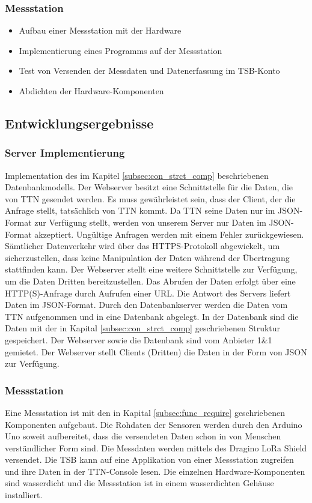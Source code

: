 \subsubsection{Messstation}
\begin{itemize}
	\item Aufbau einer Messstation mit der Hardware
	\item Implementierung eines Programms auf der Messstation
	\item Test von Versenden der Messdaten und Datenerfassung im TSB-Konto
	\item Abdichten der Hardware-Komponenten
\end{itemize}

\subsection{Entwicklungsergebnisse}

\subsubsection{Server Implementierung}

Implementation des im Kapitel \ref{subsec:con_strct_comp} beschriebenen Datenbankmodells. Der Webserver besitzt eine Schnittstelle für die Daten, die von TTN gesendet werden. Es muss gewährleistet sein, dass der Client, der die Anfrage stellt, tats\"achlich von TTN kommt. Da TTN seine Daten nur im JSON-Format zur Verf\"ugung stellt, werden von unserem Server nur Daten im JSON-Format akzeptiert. Ung\"ultige Anfragen werden mit einem Fehler zurückgewiesen. Sämtlicher Datenverkehr wird \"uber das HTTPS-Protokoll abgewickelt, um sicherzustellen, dass keine Manipulation der Daten w\"ahrend der \"Ubertragung stattfinden kann.\newline
Der Webserver stellt eine weitere Schnittstelle zur Verf\"ugung, um die Daten Dritten bereitzustellen. Das Abrufen der Daten erfolgt \"uber eine HTTP(S)-Anfrage durch Aufrufen einer URL. Die Antwort des Servers liefert Daten im JSON-Format. Durch den Datenbankserver werden die Daten vom TTN aufgenommen und in eine Datenbank abgelegt. In der Datenbank sind die Daten mit der in Kapital \ref{subsec:con_strct_comp} geschriebenen Struktur gespeichert.\newline
Der Webserver sowie die Datenbank sind vom Anbieter 1\&1 gemietet. Der Webserver stellt Clients (Dritten) die Daten in der Form von JSON zur Verfügung.

\subsubsection{Messstation}
Eine Messstation ist mit den in Kapital \ref{subsec:func_require} geschriebenen Komponenten aufgebaut. Die Rohdaten der Sensoren werden durch den Arduino Uno soweit aufbereitet, dass die versendeten Daten schon in von Menschen verständlicher Form sind. Die Messdaten werden mittels des Dragino LoRa Shield versendet. Die TSB kann auf eine Applikation von einer Messstation zugreifen und ihre Daten in der TTN-Console lesen. Die einzelnen Hardware-Komponenten sind wasserdicht und die Messstation ist in einem wasserdichten Gehäuse installiert.

